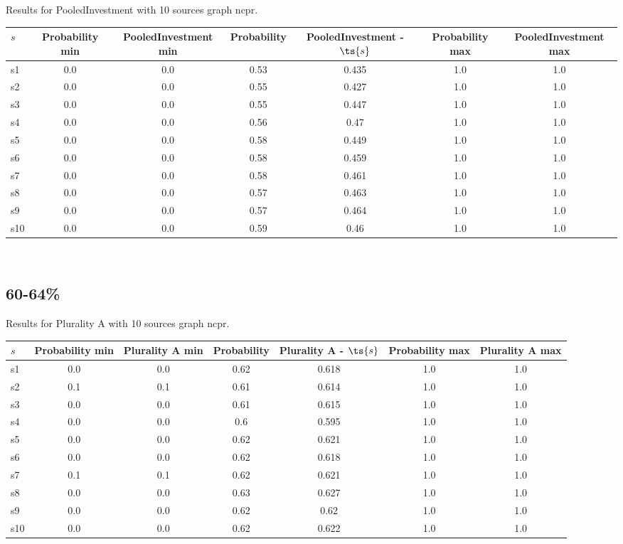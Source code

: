 \documentclass{article}
\begin{document}
\noindent Results for PooledInvestment with 10 sources graph ncpr.

\noindent\begin{tabular}{|l|c|c|c|c|c|c|}
\hline
$s$& Probability min & PooledInvestment min & Probability & PooledInvestment - $\ts{s}$ & Probability max & PooledInvestment max\\
\hline
s1 &0.0 & 0.0 & 0.53 & 0.435 & 1.0 & 1.0\\
\hline
s2 &0.0 & 0.0 & 0.55 & 0.427 & 1.0 & 1.0\\
\hline
s3 &0.0 & 0.0 & 0.55 & 0.447 & 1.0 & 1.0\\
\hline
s4 &0.0 & 0.0 & 0.56 & 0.47 & 1.0 & 1.0\\
\hline
s5 &0.0 & 0.0 & 0.58 & 0.449 & 1.0 & 1.0\\
\hline
s6 &0.0 & 0.0 & 0.58 & 0.459 & 1.0 & 1.0\\
\hline
s7 &0.0 & 0.0 & 0.58 & 0.461 & 1.0 & 1.0\\
\hline
s8 &0.0 & 0.0 & 0.57 & 0.463 & 1.0 & 1.0\\
\hline
s9 &0.0 & 0.0 & 0.57 & 0.464 & 1.0 & 1.0\\
\hline
s10 &0.0 & 0.0 & 0.59 & 0.46 & 1.0 & 1.0\\
\hline
\end{tabular}\\

\newpage

\subsection{60-64\%}

\noindent Results for Plurality A with 10 sources graph ncpr.

\noindent\begin{tabular}{|l|c|c|c|c|c|c|}
\hline
$s$& Probability min & Plurality A min & Probability & Plurality A - $\ts{s}$ & Probability max & Plurality A max\\
\hline
s1 &0.0 & 0.0 & 0.62 & 0.618 & 1.0 & 1.0\\
\hline
s2 &0.1 & 0.1 & 0.61 & 0.614 & 1.0 & 1.0\\
\hline
s3 &0.0 & 0.0 & 0.61 & 0.615 & 1.0 & 1.0\\
\hline
s4 &0.0 & 0.0 & 0.6 & 0.595 & 1.0 & 1.0\\
\hline
s5 &0.0 & 0.0 & 0.62 & 0.621 & 1.0 & 1.0\\
\hline
s6 &0.0 & 0.0 & 0.62 & 0.618 & 1.0 & 1.0\\
\hline
s7 &0.1 & 0.1 & 0.62 & 0.621 & 1.0 & 1.0\\
\hline
s8 &0.0 & 0.0 & 0.63 & 0.627 & 1.0 & 1.0\\
\hline
s9 &0.0 & 0.0 & 0.62 & 0.62 & 1.0 & 1.0\\
\hline
s10 &0.0 & 0.0 & 0.62 & 0.622 & 1.0 & 1.0\\
\hline
\end{tabular}\\
\end{document}
